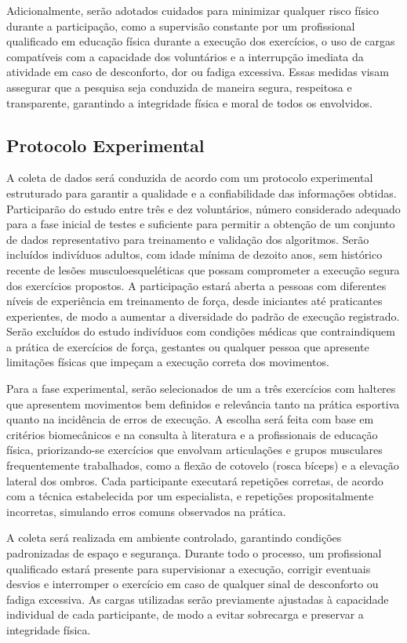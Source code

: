 Adicionalmente, serão adotados cuidados para minimizar qualquer risco físico durante a participação, como a supervisão constante por um profissional qualificado em educação física durante a execução dos exercícios, o uso de cargas compatíveis com a capacidade dos voluntários e a interrupção imediata da atividade em caso de desconforto, dor ou fadiga excessiva. Essas medidas visam assegurar que a pesquisa seja conduzida de maneira segura, respeitosa e transparente, garantindo a integridade física e moral de todos os envolvidos.

\subsection{Protocolo Experimental}

A coleta de dados será conduzida de acordo com um protocolo experimental estruturado para garantir a qualidade e a confiabilidade das informações obtidas. Participarão do estudo entre três e dez voluntários, número considerado adequado para a fase inicial de testes e suficiente para permitir a obtenção de um conjunto de dados representativo para treinamento e validação dos algoritmos. Serão incluídos indivíduos adultos, com idade mínima de dezoito anos, sem histórico recente de lesões musculoesqueléticas que possam comprometer a execução segura dos exercícios propostos. A participação estará aberta a pessoas com diferentes níveis de experiência em treinamento de força, desde iniciantes até praticantes experientes, de modo a aumentar a diversidade do padrão de execução registrado. Serão excluídos do estudo indivíduos com condições médicas que contraindiquem a prática de exercícios de força, gestantes ou qualquer pessoa que apresente limitações físicas que impeçam a execução correta dos movimentos.

Para a fase experimental, serão selecionados de um a três exercícios com halteres que apresentem movimentos bem definidos e relevância tanto na prática esportiva quanto na incidência de erros de execução. A escolha será feita com base em critérios biomecânicos e na consulta à literatura e a profissionais de educação física, priorizando-se exercícios que envolvam articulações e grupos musculares frequentemente trabalhados, como a flexão de cotovelo (rosca bíceps) e a elevação lateral dos ombros. Cada participante executará repetições corretas, de acordo com a técnica estabelecida por um especialista, e repetições propositalmente incorretas, simulando erros comuns observados na prática.

A coleta será realizada em ambiente controlado, garantindo condições padronizadas de espaço e segurança. Durante todo o processo, um profissional qualificado estará presente para supervisionar a execução, corrigir eventuais desvios e interromper o exercício em caso de qualquer sinal de desconforto ou fadiga excessiva. As cargas utilizadas serão previamente ajustadas à capacidade individual de cada participante, de modo a evitar sobrecarga e preservar a integridade física.


